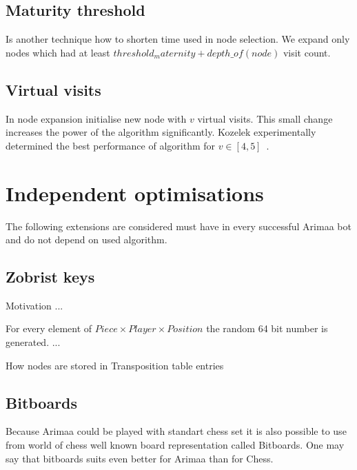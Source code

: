 \subsection{Maturity threshold}
Is another technique how to shorten time used in node selection. We
expand only nodes which had at least $threshold_maternity + depth\_of(node)$
visit count.

\subsection{Virtual visits}
In node expansion initialise new node with $v$ virtual visits. This small
change increases the power of the algorithm significantly. Kozelek
experimentally determined the best performance of algorithm for $v \in
[4,5]$~\cite{KOZELEK}.

\section{Independent optimisations}
The following extensions are considered must have in every successful Arimaa
bot and do not depend on used algorithm.

	\subsection{Zobrist keys}
	Motivation ...

	For every element of $Piece\times Player\times Position$ the random 64 bit
	number is generated. ...

	How nodes are stored in Transposition table entries

	\subsection{Bitboards}
	Because Arimaa could be played with standart chess set it is also possible
	to use from world of chess well known board representation called
	Bitboards. One may say that bitboards suits even better for Arimaa than for
	Chess.

% 
% 

